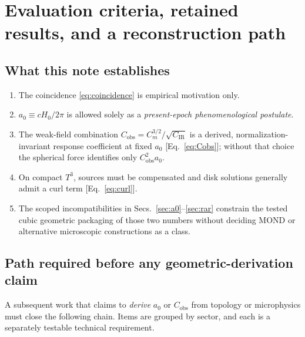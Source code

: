 \documentclass[aps,prd,reprint,superscriptaddress,nofootinbib,floatfix,showkeys]{revtex4-2}
\newcommand{\Tthree}{T^{3}}
\newcommand{\Cobs}{C_{\mathrm{obs}}}
\newcommand{\Cm}{C_{m}}
\newcommand{\CIR}{C_{\mathrm{IR}}}
\newcommand{\azero}{a_{0}}
\newcommand{\Hzero}{H_{0}}
\begin{document}
\section{Evaluation criteria, retained results, and a reconstruction path}
\label{sec:path}

\subsection{What this note establishes}

\begin{enumerate}
\item The coincidence \eqref{eq:coincidence} is empirical motivation only.
\item \(\azero\equiv c\Hzero/2\pi\) is allowed solely as a
  \emph{present-epoch phenomenological postulate}.
\item The weak-field combination
  \(\Cobs=\Cm^{3/2}/\sqrt{\CIR}\) is a derived, normalization-invariant
  response coefficient at fixed \(\azero\) [Eq.~\eqref{eq:Cobs}]; without that
  choice the spherical force identifies only \(\Cobs^2\azero\).
\item On compact \(\Tthree\), sources must be compensated and disk solutions
  generally admit a curl term [Eq.~\eqref{eq:curl}].
\item The scoped incompatibilities in Secs.~\ref{sec:a0}--\ref{sec:rar}
  constrain the tested cubic geometric packaging of those two numbers without
  deciding MOND or alternative microscopic constructions as a class.
\end{enumerate}

\subsection{Path required before any geometric-derivation claim}

A subsequent work that claims to \emph{derive} \(\azero\) or \(\Cobs\) from
topology or microphysics must close the following chain.  Items are grouped
by sector, and each is a separately testable technical requirement.
\end{document}
